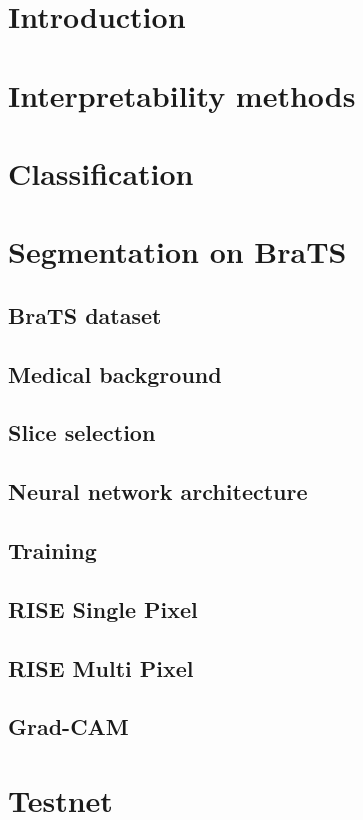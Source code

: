 \chapter{Introduction}


\chapter{Interpretability methods}


\chapter{Classification}


\chapter{Segmentation on BraTS}

\section{BraTS dataset}
\section{Medical background}
\section{Slice selection}
\section{Neural network architecture}
\section{Training}
\section{RISE Single Pixel}
\section{RISE Multi Pixel}
\section{Grad-CAM}

\chapter{Testnet}
